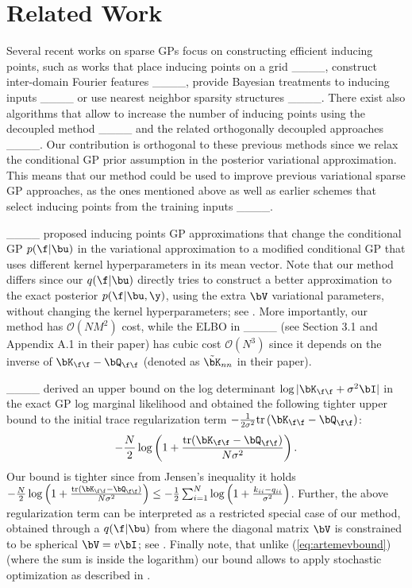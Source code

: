 \section{Related Work
\label{sec:relatedwork}
}


Several recent works on sparse GPs focus on constructing  efficient inducing points, such as works that place inducing points on a grid ____, construct inter-domain Fourier features ____, provide Bayesian treatments to inducing inputs ____
or use nearest neighbor 
sparsity structures
____.
There exist also algorithms that  allow to increase the number of inducing points using the decoupled method ____
and the related orthogonally decoupled approaches 
____. 
Our contribution is orthogonal to these previous methods since 
we relax the conditional GP
prior
assumption in the posterior variational approximation. This means that our method could be used to improve previous variational sparse GP approaches,
as the  ones mentioned above as well as earlier schemes that select inducing points from the training inputs ____. 

____ proposed 
inducing points GP approximations that change the conditional GP $p(\f | \bu)$ in the variational approximation to a modified conditional GP that uses different kernel hyperparameters in its mean vector. 
Note that our method differs since
our $q(\f | \bu)$ directly tries to 
construct a better approximation to the exact posterior
$p(\f | \bu, \y)$, using the extra $\bV$ variational parameters, 
without changing the kernel hyperparameters; see . More 
importantly, our method has $\mathcal{O}(N M^2)$ cost, while the ELBO in  ____ (see Section 3.1 and Appendix A.1 in their paper) has cubic cost $\mathcal{O}(N^3)$ since it depends
on the inverse of $\bK_{\f \f} - \bQ_{\f \f}$ (denoted as $\tilde{\bK}_{nn}$ in their paper).  %

____
derived an upper bound on the log determinant $\log |\bK_{\f \f} + \sigma^2 \bI|$ in the exact GP log marginal likelihood and obtained the following tighter upper bound to the initial trace 
regularization term $-\frac{1}{2 \sigma^2} \text{tr}\left(  \bK_{\f\f} - \bQ_{\f\f} \right)$: 
\begin{equation}
- \frac{N}{ 2} \log\left( 1 + 
\frac{\text{tr}(\bK_{\f\f} - \bQ_{\f\f})}{N \sigma^2} \right).
\label{eq:artemevbound}
\end{equation}
Our bound is tighter since 
from Jensen's inequality 
it holds $ - \frac{N}{ 2} \log\left( 1 + 
\frac{\text{tr}(\bK_{\f\f} - \bQ_{\f\f})}{N \sigma^2} \right)
\leq - \frac{1}{2} \sum_{i=1}^N \log\left( 1 + 
\frac{k_{ii} - q_{ii}}{\sigma^2} \right)$. Further, the above regularization term
can be interpreted as a restricted special case of our method, obtained through a $q(\f | \bu)$ from  where the diagonal matrix $\bV$ is constrained to be spherical $\bV = v  \bI$; see . Finally note, 
that unlike (\ref{eq:artemevbound}) 
(where the sum is inside the logarithm) our bound allows to apply stochastic optimization
as described in .

